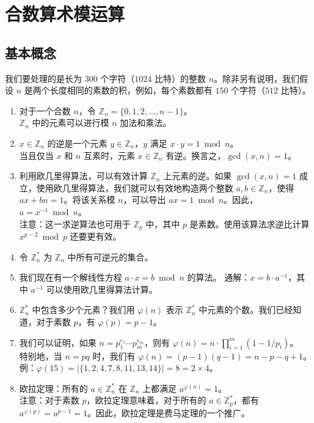 \section{合数算术模运算}\label{sec:A-3}

\subsection{基本概念}\label{subsec:A-3-1}

我们要处理的是长为 $300$ 个字符（$1024$ 比特）的整数 $n$。除非另有说明，我们假设 $n$ 是两个长度相同的素数的积，例如，每个素数都有 $150$ 个字符（$512$ 比特）。
\begin{enumerate}
	\item 对于一个合数 $n$，令 $\mathbb{Z}_n=\{0,1,2,\dots,n-1\}$。\\    
    $\mathbb{Z}_n$ 中的元素可以进行模 $n$ 加法和乘法。
	\item $x\in\mathbb{Z}_n$ 的逆是一个元素 $y\in\mathbb{Z}_n$，$y$ 满足 $x\cdot y=1 \bmod n$。\\    
    当且仅当 $x$ 和 $n$ 互素时，元素 $x\in\mathbb{Z}_n$ 有逆。换言之，$\gcd(x,n)=1$。    
	\item 利用欧几里得算法，可以有效计算 $\mathbb{Z}_n$ 上元素的逆。如果 $\gcd(x,n)=1$ 成立，使用欧几里得算法，我们就可以有效地构造两个整数 $a,b\in\mathbb{Z}_n$，使得 $ax+bn=1$。将该关系模 $n$，可以导出 $ax=1 \bmod n$。因此，$a=x^{-1} \bmod n$。\\
    注意：这一求逆算法也可用于 $\mathbb{Z}_p$ 中，其中 $p$ 是素数。使用该算法求逆比计算 $x^{p-2} \bmod p$ 还要更有效。
	\item 令 $\mathbb{Z}_n^*$ 为 $\mathbb{Z}_n$ 中所有可逆元的集合。
	\item 我们现在有一个解线性方程 $a\cdot x = b \bmod n$ 的算法。    
    通解：$x=b\cdot a^{-1}$，其中 $a^{-1}$ 可以使用欧几里得算法计算。    
	\item $\mathbb{Z}_n^*$ 中包含多少个元素？我们用 $\varphi(n)$ 表示 $\mathbb{Z}_n^*$ 中元素的个数。我们已经知道，对于素数 $p$，有 $\varphi(p)=p-1$。    
	\item 我们可以证明，如果 $n=p_1^{e_1}\cdots p_m^{e_m}$，则有 $\varphi(n)=n\cdot\prod_{i=1}^m(1-1/p_i)$。\\
    特别地，当 $n=pq$ 时，我们有 $\varphi(n)=(p-1)(q-1)=n-p-q+1$。\\
    例：$\varphi(15)=\big\lvert\{1,2,4,7,8,11,13,14\}\big\rvert=8=2\times4$。
	\item 欧拉定理：所有的 $a\in\mathbb{Z}_n^*$ 在 $\mathbb{Z}_n$ 上都满足 $a^{\varphi(n)}=1$。\\
    注意：对于素数 $p$，欧拉定理意味着，对于所有的 $a\in\mathbb{Z}_p^*$，都有 $a^{\varphi(p)}=a^{p-1}=1$。因此，欧拉定理是费马定理的一个推广。
\end{enumerate}

